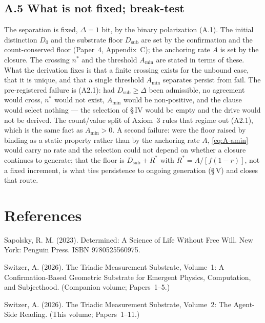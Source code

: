 \documentclass[11pt,oneside]{report}
\theoremstyle{definition}
\theoremstyle{remark}
\newenvironment{reflist}
  {\par\small\setlength{\parindent}{0pt}%
   \setlength{\leftskip}{1.6em}\setlength{\parindent}{-1.6em}%
   \setlength{\parskip}{0.4em}%
   \raggedright\hyphenpenalty=50\exhyphenpenalty=50\relax
   \sloppy}
  {\par}
\begin{document}
\subsection*{A.5 What is not fixed; break-test}

The separation is fixed, \ensuremath{\Delta = 1} bit, by the binary polarization (A.1). The
initial distinction \ensuremath{D_0} and the substrate floor \ensuremath{D_{\mathrm{sub}}}
are set by the confirmation and the count-conserved floor (Paper~4, Appendix~C); the
anchoring rate \ensuremath{A} is set by the closure. The crossing \ensuremath{n^{*}} and
the threshold \ensuremath{A_{\min}} are stated in terms of these. What the derivation
fixes is that a finite crossing exists for the unbound case, that it is unique, and that
a single threshold \ensuremath{A_{\min}} separates persist from fail. The pre-registered failure is (A2.1): had \ensuremath{D_{\mathrm{sub}} \geq
\Delta} been admissible, no agreement would cross, \ensuremath{n^{*}} would not exist,
\ensuremath{A_{\min}} would be non-positive, and the clause would select nothing --- the
selection of \S\,IV would be empty and the drive would not be derived. The count/value split of Axiom~3
rules that regime out (A2.1), which is the same fact as \ensuremath{A_{\min} > 0}. A
second failure: were the floor raised by binding as a static property rather than by the
anchoring rate \ensuremath{A}, \eqref{eq:A-amin} would carry no rate and the selection
could not depend on whether a closure continues to generate; that the floor is
\ensuremath{D_{\mathrm{sub}} + R^{*}} with \ensuremath{R^{*} = A/[f(1-r)]}, not a fixed
increment, is what ties persistence to ongoing generation (\S\,V) and closes that route.


\section*{References}
\begin{reflist}
Sapolsky, R. M. (2023). Determined: A Science of Life Without Free Will. New
York: Penguin Press. ISBN 9780525560975.

Switzer, A. (2026). The Triadic Measurement Substrate, Volume~1: A
Confirmation-Based Geometric Substrate for Emergent Physics, Computation, and
Subjecthood. (Companion volume; Papers~1--5.)

Switzer, A. (2026). The Triadic Measurement Substrate, Volume~2: The Agent-Side
Reading. (This volume; Papers~1--11.)
\end{reflist}
\end{document}

